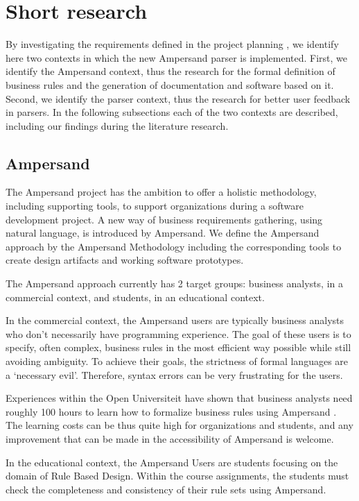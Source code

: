
\section{Short research}
\label{sec:research}
By investigating the requirements defined in the project planning , we identify here two contexts in which the new Ampersand parser is implemented.
First, we identify the Ampersand context, thus the research for the formal definition of business rules and the generation of documentation and software based  on it.
Second, we identify the parser context, thus the research for better user feedback in parsers.
In the following subsections each of the two contexts are described, including our findings during the literature research.

\subsection{Ampersand}
The Ampersand project has the ambition to offer a holistic methodology, including supporting tools, to support organizations during a software development project.
A new way of business requirements gathering, using natural language, is introduced by Ampersand.
We define the Ampersand approach by the Ampersand Methodology including the corresponding tools to create design artifacts and working software prototypes.

The Ampersand approach currently has 2 target groups: business analysts, in a commercial context, and students, in an educational context.

In the commercial context, the Ampersand users are typically business analysts who don't necessarily have programming experience.
The goal of these users is to specify, often complex, business rules in the most efficient way possible while still avoiding ambiguity.
To achieve their goals, the strictness of formal languages are a `necessary evil'.
Therefore, syntax errors can be very frustrating for the users.

Experiences within the Open Universiteit have shown that business analysts need roughly 100 hours to learn how to formalize business rules using Ampersand .
The learning costs can be thus quite high for organizations and students, and any improvement that can be made in the accessibility of Ampersand is welcome.

In the educational context, the Ampersand Users are students focusing on the domain of Rule Based Design. 
Within the course assignments, the students must check the completeness and consistency of their rule sets using Ampersand. 
 
